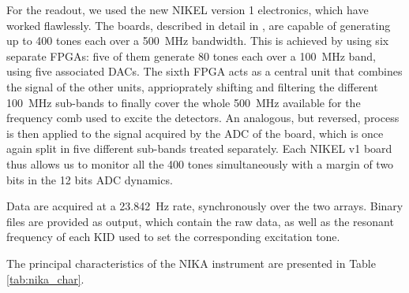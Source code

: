 

For the readout, we used the new NIKEL version 1 electronics, which have
worked flawlessly. The boards, described in detail in \cite{Bourrion2012}, are
capable of generating up to 400 tones each over a 500~MHz bandwidth. This is
achieved by using six separate FPGAs: five of them generate 80 tones each over a
100~MHz band, using five associated DACs. The sixth FPGA acts as a central unit
that combines the signal of the other units, apprioprately shifting and
filtering the different 100~MHz sub-bands to finally cover the whole 500~MHz
available for the frequency comb used to excite the detectors. An analogous,
but reversed, process is then applied to the signal acquired by the ADC of the
board, which is once again split in five different sub-bands treated
separately. Each NIKEL v1 board thus allows us to monitor all the 400 tones
simultaneously with a margin of two bits in the 12 bits ADC dynamics.




Data are acquired at a 23.842~Hz rate, synchronously over the two arrays. Binary
files are provided as output, which contain the raw data, as well as the
resonant frequency of each KID used to set the corresponding excitation tone.

The principal characteristics of the NIKA instrument are presented in Table \ref{tab:nika_char}. 



